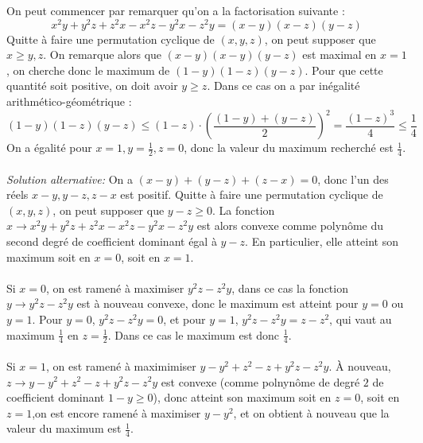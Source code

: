 \begin{sol}
On peut commencer par remarquer qu'on a la factorisation suivante :
$$x^2y + y^2z + z^2x - x^2z - y^2x - z^2y = (x - y)(x - z)(y - z)$$
Quitte à faire une permutation cyclique de $(x, y, z)$, on peut supposer que $x\ge y, z$. On remarque alors que $(x - y)(x - y)(y - z)$ est maximal en $x = 1$, on cherche donc le maximum de $(1 - y)(1 - z)(y - z)$. Pour que cette quantité soit positive, on doit avoir $y\ge z$. Dans ce cas on a par inégalité arithmético-géométrique :
$$(1 - y)(1 - z)(y - z)\le (1-z)\cdot \left(\frac{(1-y)+(y-z)}{2}\right)^2=\frac{(1-z)^3}{4}\le \frac{1}{4}$$
On a égalité pour $x = 1, y=\frac{1}{2}, z=0$, donc la valeur du maximum recherché est $\frac{1}{4}$. \\\\
\textit{Solution alternative:} On a $(x-y)+(y-z)+(z-x)=0$, donc l'un des réels $x - y, y - z,z - x$ est positif. Quitte à faire une permutation cyclique de $(x, y, z)$, on peut supposer que $y - z\ge 0$. La fonction $x\to x^2y+y^2z+z^2x-x^2z-y^2x-z^2y$ est alors convexe comme polynôme du second degré de coefficient dominant égal à $y-z$. En particulier, elle atteint son maximum soit en $x=0$, soit en $x=1$.\\\\
Si $x=0$, on est ramené à maximiser $y^2z-z^2y$, dans ce cas la fonction $y\to y^2z-z^2y$ est à nouveau convexe, donc le maximum est atteint pour $y=0$ ou $y=1$. Pour $y=0$, $y^2z-z^2y=0$, et pour $y=1$, $y^2z-z^2y=z-z^2$, qui vaut au maximum $\frac{1}{4}$ en $z=\frac{1}{2}$. Dans ce cas le maximum est donc $\frac{1}{4}$. \\\\
Si $x=1$, on est ramené à maximimiser $y-y^2+z^2-z+y^2z-z^2y$. À nouveau, $z\to y-y^2+z^2-z+y^2z-z^2y$ est convexe (comme polnynôme de degré $2$ de coefficient dominant $1-y\ge 0$), donc atteint son maximum soit en $z=0$, soit en $z=1$,on est encore ramené à maximiser $y-y^2$, et on obtient à nouveau que la valeur du maximum est $\frac{1}{4}$.
\end{sol}


